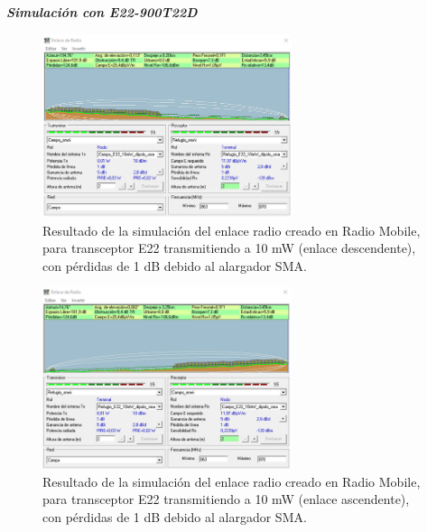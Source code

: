 \documentclass[12pt]{article}
\begin{document}
	\pagebreak
	
	\noindent \textit{\textbf{Simulación con E22-900T22D}} \\
	\begin{figure}[h!]
		\begin{center}
			\includegraphics[width=0.65\textwidth]{img/resultado_e22_10mW_conPerdidas_desc.png}
			\caption{Resultado de la simulación del enlace radio creado en Radio Mobile, para transceptor E22 transmitiendo a 10 mW (enlace descendente), con pérdidas de 1 dB debido al alargador SMA.}
			\label{fig: resultado enlace e22 10mW descendente con perdidas radio mobile}
		\end{center}
	\end{figure}
	
	
	\begin{figure}[h!]
		\begin{center}
			\includegraphics[width=0.65\textwidth]{img/resultado_e22_10mW_conPerdidas_asc.png}
			\caption{Resultado de la simulación del enlace radio creado en Radio Mobile, para transceptor E22 transmitiendo a 10 mW (enlace ascendente), con pérdidas de 1 dB debido al alargador SMA.}
			\label{fig: resultado enlace e22 10mW ascendente con perdidas radio mobile}
		\end{center}
	\end{figure}
	
\end{document}
